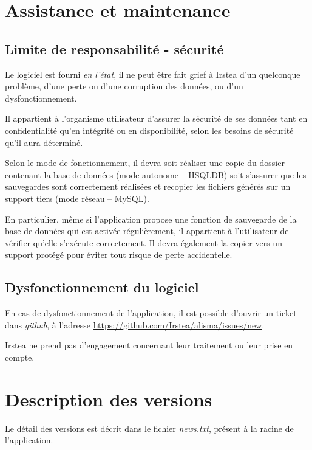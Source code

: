 \section{Assistance et maintenance}

\subsection{Limite de responsabilité - sécurité}

Le logiciel est fourni \textit{en l'état}, il ne peut être fait grief à Irstea d'un quelconque problème, d'une perte ou d'une corruption des données, ou d'un dysfonctionnement.

Il appartient à l'organisme utilisateur d'assurer la sécurité de ses données tant en confidentialité qu'en intégrité ou en disponibilité, selon les besoins de sécurité qu'il aura déterminé. 

Selon le mode de fonctionnement, il devra soit réaliser une copie du dossier contenant la base de données (mode autonome -- HSQLDB) soit s'assurer que les sauvegardes sont correctement réalisées et recopier les fichiers générés sur un support tiers (mode réseau -- MySQL).

En particulier, même si l'application propose une fonction de sauvegarde de la base de données qui est activée régulièrement, il appartient à l'utilisateur de vérifier qu'elle s'exécute correctement. Il devra également la copier vers un support protégé pour éviter tout risque de perte accidentelle.

\subsection{Dysfonctionnement du logiciel}

En cas de dysfonctionnement de l'application, il est possible d'ouvrir un ticket dans \textit{github}, à l'adresse \url{https://github.com/Irstea/alisma/issues/new}.

Irstea ne prend pas d'engagement concernant leur traitement ou leur prise en compte.

\section{Description des versions}
Le détail des versions est décrit dans le fichier \textit{news.txt}, présent à la racine de l'application.
